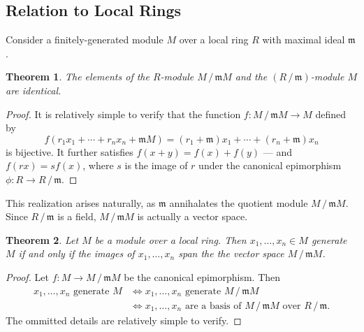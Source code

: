 \documentclass[11pt]{article}
\newtheorem{theorem}{Theorem}
\begin{document}

\subsection{Relation to Local Rings}

Consider a finitely-generated module $M$ over a local ring $R$ with maximal ideal $\mathfrak{m}$. 

\begin{adjustwidth}{0.5cm}{}
	\begin{theorem}
		The elements of the $R$-module $M \,/\, \mathfrak{m} M$ and the $(R \,/\, \mathfrak{m})$-module $M$ are identical.
	\end{theorem}
	\begin{proof}
		It is relatively simple to verify that the function $f : M \,/\, \mathfrak{m} M \to M$ defined by
		\[
			f(r_{1} x_{1} + \cdots + r_{n} x_{n} + \mathfrak{m}M) = (r_{1} + \mathfrak{m})x_{1} + \cdots + (r_{n} + \mathfrak{m})x_{n}
		\]
		is bijective. It further satisfies $f(x + y) = f(x) + f(y)$ --- and $f(rx) = s f(x)$, where $s$ is the image of $r$ under the canonical epimorphism $\phi : R \to R \,/\, \mathfrak{m}$.
	\end{proof}
\end{adjustwidth}

This realization arises naturally, as $\mathfrak{m}$ annihalates the quotient module $M \,/\, \mathfrak{m} M$. Since $R \,/\, \mathfrak{m}$ is a field, $M \,/\, \mathfrak{m} M$ is actually a vector space.

\begin{adjustwidth}{0.5cm}{}
	\begin{theorem}
		Let $M$ be a module over a local ring. Then $x_{1}, \ldots, x_{n} \in M$ generate $M$ if and only if the images of $x_{1}, \ldots, x_{n}$ span the the vector space $M \,/\, \mathfrak{m} M$.
	\end{theorem}
	\begin{proof}
		Let $f : M \to M \,/\, \mathfrak{m} M$ be the canonical epimorphism. Then
		\begin{align*}
			\text{$x_{1}, \ldots, x_{n}$ generate $M$} &\iff \text{$x_{1}, \ldots, x_{n}$ generate $M \,/\, \mathfrak{m} M$} \\
			&\iff \text{$x_{1}, \ldots, x_{n}$ are a basis of $M \,/\, \mathfrak{m} M$ over $R \,/\, \mathfrak{m}$}.
		\end{align*}
		The ommitted details are relatively simple to verify.
	\end{proof}
\end{adjustwidth}
\end{document}
